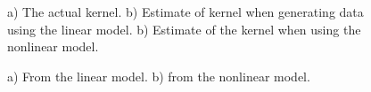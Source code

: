 \documentclass[conference]{IEEEtran}
\begin{document}
\begin{figure}[t!]
{	\label{fig:KernelEstimateNonlinear}}
	\label{fig:Kernels}
	\caption{a) The actual kernel. b) Estimate of kernel when generating data using the linear model. b) Estimate of the kernel when using the nonlinear model.}
\end{figure}

\newpage

\begin{figure}[t!]
	\centering
	\caption{a) From the linear model. b) from the nonlinear model.}
\end{figure}
\end{document}

